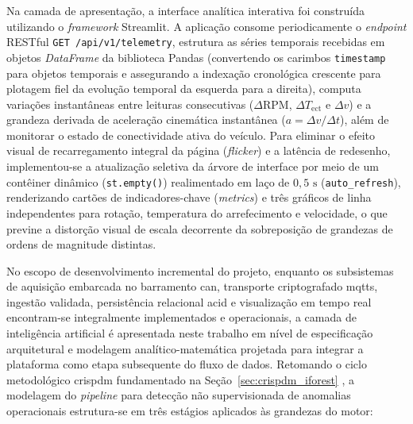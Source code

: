 \documentclass[
	12pt,				%
	openright,			%
	twoside,			%
	a4paper,			%
	english,			%
	brazil				%
	]{abntex2}
\begin{document}
Na camada de apresentação, a interface analítica interativa foi construída utilizando o
\textit{framework} Streamlit. A aplicação consome periodicamente o \textit{endpoint}
RESTful \texttt{GET /api/v1/telemetry}, estrutura as séries temporais recebidas em
objetos \textit{DataFrame} da biblioteca Pandas (convertendo os carimbos
\texttt{timestamp} para objetos temporais e assegurando a indexação cronológica
crescente para plotagem fiel da evolução temporal da esquerda para a direita), computa
variações instantâneas entre leituras consecutivas ($\Delta\text{RPM}$,
$\Delta T_{\text{ect}}$ e $\Delta v$) e a grandeza derivada de aceleração cinemática
instantânea ($a = \Delta v / \Delta t$), além de monitorar o estado de conectividade
ativa do veículo. Para eliminar o efeito visual de recarregamento integral da página
(\textit{flicker}) e a latência de redesenho, implementou-se a atualização seletiva da
árvore de interface por meio de um contêiner dinâmico (\texttt{st.empty()}) realimentado
em laço de $0{,}5\text{ s}$ (\texttt{auto\_refresh}), renderizando cartões de
indicadores-chave (\textit{metrics}) e três gráficos de linha independentes para
rotação, temperatura do arrefecimento e velocidade, o que previne a distorção visual de
escala decorrente da sobreposição de grandezas de ordens de magnitude distintas.

No escopo de desenvolvimento incremental do projeto, enquanto os subsistemas de
aquisição embarcada no barramento \acrshort{can}, transporte criptografado
\acrshort{mqtts}, ingestão validada, persistência relacional \acrshort{acid} e
visualização em tempo real encontram-se integralmente implementados e operacionais, a
camada de inteligência artificial é apresentada neste trabalho em nível de especificação
arquitetural e modelagem analítico-matemática projetada para integrar a plataforma como
etapa subsequente do fluxo de dados. Retomando o ciclo metodológico \acrshort{crispdm}
fundamentado na Seção~\ref{sec:crispdm_iforest} \cite{wirth2000,geron2022}, a modelagem
do \textit{pipeline} para detecção não supervisionada de anomalias operacionais
estrutura-se em três estágios aplicados às grandezas do motor:
\end{document}
